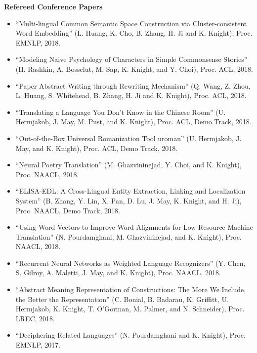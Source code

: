 \noindent
{\bf Refereed Conference Papers}
\begin{itemize}

\item ``Multi-lingual Common Semantic Space Construction via Cluster-consistent Word Embedding'' (L. Huang, K. Cho, B. Zhang, H. Ji and K. Knight), Proc. EMNLP, 2018. 

\item ``Modeling Naive Psychology of Characters in Simple Commonsense Stories'' (H. Rashkin, A. Bosselut, M. Sap, K. Knight, and Y. Choi), Proc. ACL, 2018.

\item ``Paper Abstract Writing through Rewriting Mechanism'' (Q. Wang, Z. Zhou, L. Huang, S. Whitehead, B. Zhang, H. Ji and K. Knight), Proc. ACL, 2018.

\item ``Translating a Language You Don't Know in the Chinese Room'' (U. Hermjakob, J. May, M. Pust, and K. Knight), Proc. ACL, Demo Track, 2018.

\item ``Out-of-the-Box Universal Romanization Tool uroman'' (U. Hermjakob, J. May, and K. Knight), Proc. ACL, Demo Track, 2018.

\item ``Neural Poetry Translation'' (M. Ghazvininejad, Y. Choi, and K. Knight), Proc. NAACL, 2018.

\item ``ELISA-EDL: A Cross-Lingual Entity Extraction, Linking and Localization System'' (B. Zhang, Y. Lin, X. Pan, D. Lu, J. May, K. Knight, and H. Ji), Proc. NAACL, Demo Track, 2018.

\item ``Using Word Vectors to Improve Word Alignments for Low Resource Machine Translation'' (N. Pourdamghani, M. Ghazvininejad, and K. Knight), Proc. NAACL, 2018.

\item ``Recurrent Neural Networks as Weighted Language Recognizers'' (Y. Chen, S. Gilroy, A. Maletti, J. May, and K. Knight), Proc. NAACL, 2018. 

\item ``Abstract Meaning Representation of Constructions: The More We Include, the Better the Representation'' (C. Bonial, B. Badarau, K. Griffitt, U. Hermjakob, K. Knight, T. O'Gorman, M. Palmer, and N. Schneider), Proc. LREC, 2018. 

\item ``Deciphering Related Languages'' (N. Pourdamghani and K. Knight), Proc. EMNLP, 2017. 


\end{itemize}
